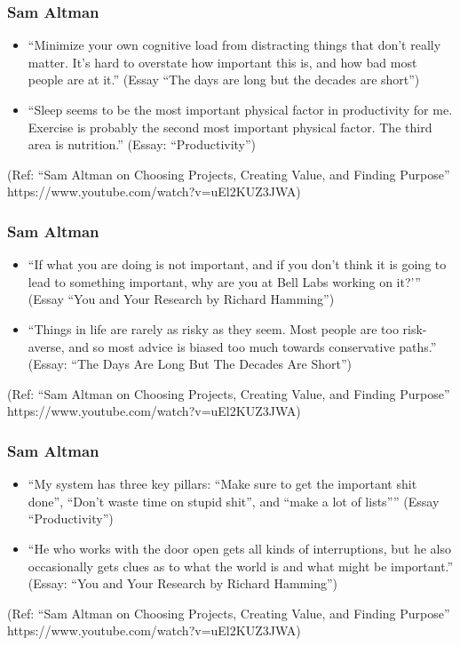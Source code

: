\begin{frame}[fragile]\frametitle{Sam Altman}

\begin{itemize}

\item ``Minimize your own cognitive load from distracting things that don’t really matter. It’s hard to overstate how important this is, and how bad most people are at it.'' (Essay ``The days are long but the decades are short'')
\item ``Sleep seems to be the most important physical factor in productivity for me. Exercise is probably the second most important physical factor. The third area is nutrition.'' (Essay: ``Productivity'')
\end{itemize}

{\tiny (Ref: ``Sam Altman on Choosing Projects, Creating Value, and Finding Purpose'' https://www.youtube.com/watch?v=uEl2KUZ3JWA)}


\end{frame}

\begin{frame}[fragile]\frametitle{Sam Altman}

\begin{itemize}

\item ``If what you are doing is not important, and if you don’t think it is going to lead to something important, why are you at Bell Labs working on it?’'' (Essay ``You and Your Research by Richard Hamming'')
\item ``Things in life are rarely as risky as they seem. Most people are too risk-averse, and so most advice is biased too much towards conservative paths.'' (Essay: ``The Days Are Long But The Decades Are Short'')
\end{itemize}

{\tiny (Ref: ``Sam Altman on Choosing Projects, Creating Value, and Finding Purpose'' https://www.youtube.com/watch?v=uEl2KUZ3JWA)}
\end{frame}


\begin{frame}[fragile]\frametitle{Sam Altman}

\begin{itemize}

\item ``My system has three key pillars: “Make sure to get the important shit done”, “Don’t waste time on stupid shit”, and “make a lot of lists”'' (Essay ``Productivity'')
\item ``He who works with the door open gets all kinds of interruptions, but he also occasionally gets clues as to what the world is and what might be important.'' (Essay: ``You and Your Research by Richard Hamming'')
\end{itemize}

{\tiny (Ref: ``Sam Altman on Choosing Projects, Creating Value, and Finding Purpose'' https://www.youtube.com/watch?v=uEl2KUZ3JWA)}
\end{frame}


